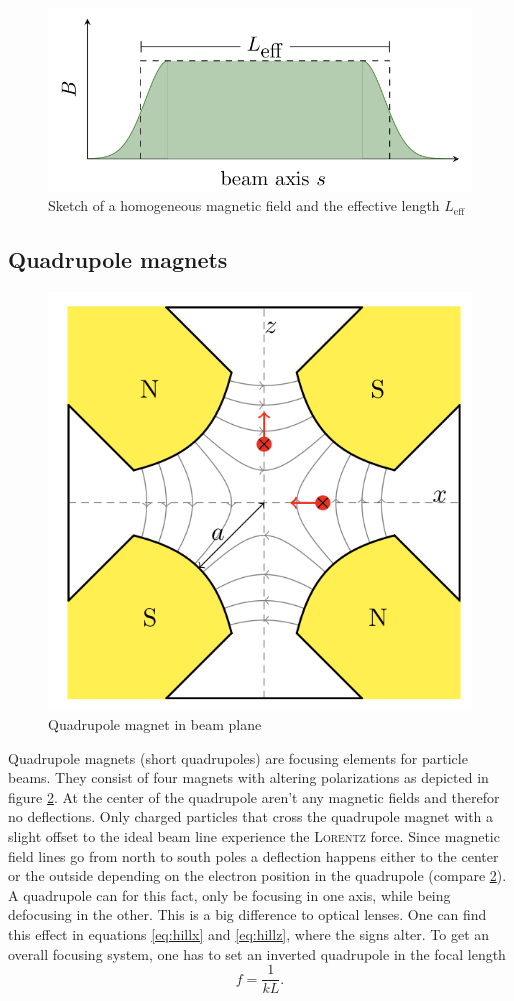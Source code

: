 \documentclass[11pt,a4paper,notitlepage]{scrartcl}
\begin{document}
\begin{figure}[h]
	\centering
	\includegraphics[width=0.5\linewidth]{figs/effective_length.png}
	\caption{Sketch of a homogeneous magnetic field and the effective length $L_\text{eff}$ \cite{script}}\label{fig:effective_length}
\end{figure}
\newpage
\subsection{Quadrupole magnets}
\begin{figure}
	\vspace{-.8cm}
	\includegraphics[width=\linewidth]{figs/quadrupole.png}
	\caption{Quadrupole magnet in beam plane \cite{script}}\label{fig:quadrupoles}
\end{figure}
Quadrupole magnets (short quadrupoles) are focusing elements for particle beams. They consist of four magnets with altering polarizations as depicted in figure \ref{fig:quadrupoles}. At the center of the quadrupole aren't any magnetic fields and therefor no deflections. Only charged particles that cross the quadrupole magnet with a slight offset to the ideal beam line experience the \textsc{Lorentz} force. Since magnetic field lines go from north to south poles a deflection happens either to the center or the outside depending on the electron position in the quadrupole (compare \ref{fig:quadrupoles}). A quadrupole can for this fact, only be focusing in one axis, while being defocusing in the other. This is a big difference to optical lenses. One can find this effect in equations \ref{eq:hillx} and \ref{eq:hillz}, where the signs alter. To get an overall focusing system, one has to set an inverted quadrupole in the focal length $$f=\frac{1}{kL}.$$
\end{document}
